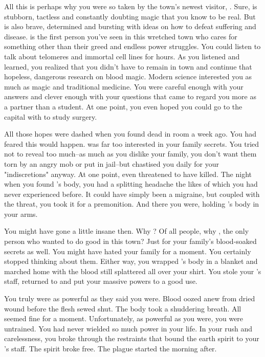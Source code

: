 \documentclass[char]{Pestilence}
\begin{document}
All this is perhaps why you were so taken by the town's newest visitor, \cOutsider{}. Sure, \cOutsider{\they} is stubborn, tactless and constantly doubting magic that you know to be real. But \cOutsider{\they} is also brave, determined and bursting with ideas on how to defeat suffering and disease. \cOutsider{\They} is the first person you've seen in this wretched town who cares for something other than their greed and endless power struggles. You could listen to \cOutsider{\them} talk about telomeres and immortal cell lines for hours. As you listened and learned, you realized that you didn't have to remain in town and continue that hopeless, dangerous research on blood magic. Modern science interested you as much as magic and traditional medicine. You were careful enough with your answers and clever enough with your questions that \cOutsider{} came to regard you more as a partner than a student. At one point, you even hoped you could go to the capital with \cOutsider{\them} to study surgery.

All those hopes were dashed when you found \cOutsider{} dead in \cOutsider{\their} room a week ago. You had feared this would happen. \cOutsider{} was far too interested in your family secrets. You tried not to reveal too much--as much as you dislike your family, you don't want them torn by an angry mob or put in jail--but \cApprentice{} chastised you daily for your "indiscretions" anyway. At one point, \cApprentice{\they} even threatened to have \cOutsider{} killed. The night when you found \cOutsider{}'s body, you had a splitting headache the likes of which you had never experienced before. It could have simply been a migraine, but coupled with the threat, you took it for a premonition. And there you were, holding \cOutsider{}'s body in your arms.

You might have gone a little insane then. Why \cOutsider{\them}? Of all people, why \cOutsider{}, the only person who wanted to do good in this town? Just for your family's blood-soaked secrets as well. You might have hated your family for a moment. You certainly stopped thinking about them. Either way, you wrapped \cOutsider{}'s body in a blanket and marched home with the blood still splattered all over your shirt. You stole your \cElder{\parent}'s staff, returned to \cOutsider{} and put your massive powers to a good use.

You truly were as powerful as they said you were. Blood oozed anew from dried wound before the flesh sewed shut. The body took a shuddering breath. All seemed fine for a moment. Unfortunately, as powerful as you were, you were untrained. You had never wielded so much power in your life. In your rush and carelessness, you broke through the restraints that bound the earth spirit to your \cElder{\parent}'s staff. The spirit broke free. The plague started the morning after.
\end{document}

